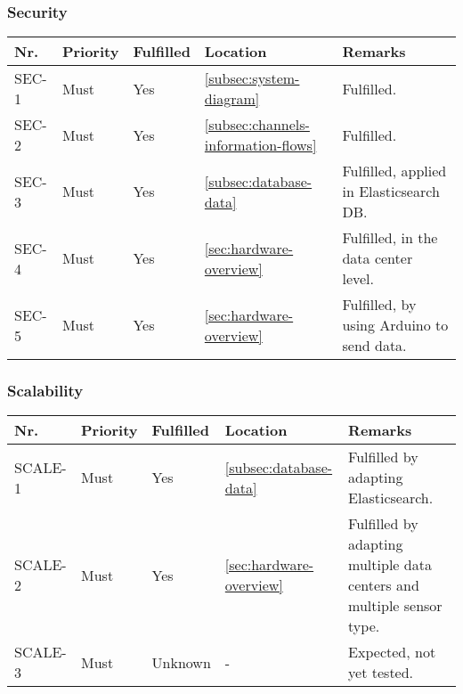 \subsubsection{Security}
\begin{table}[H]
	\begin{tabular}{lllll}
						    
		Nr.   & Priority & Fulfilled & Location & Remarks \\ \hline
		SEC-1 & Must     & Yes      & \ref{subsec:system-diagram} & Fulfilled. \\ 
		SEC-2 & Must     & Yes      & \ref{subsec:channels-information-flows} & Fulfilled. \\ 
		SEC-3 & Must     & Yes      & \ref{subsec:database-data} & Fulfilled, applied in Elasticsearch DB. \\ 
		SEC-4 & Must     & Yes      & \ref{sec:hardware-overview} & Fulfilled, in the data center level. \\ 
		SEC-5 & Must     & Yes      & \ref{sec:hardware-overview} & Fulfilled, by using Arduino to send data.\\
						
	\end{tabular}
\end{table}

\subsubsection{Scalability}
\begin{table}[H]
	\begin{tabular}{lllll}
						    
		Nr.     & Priority & Fulfilled & Location & Remarks \\ \hline
		SCALE-1 & Must     & Yes      & \ref{subsec:database-data} & Fulfilled by adapting Elasticsearch. \\ 
		SCALE-2 & Must     & Yes      & \ref{sec:hardware-overview} & Fulfilled by adapting multiple data centers and multiple sensor type. \\ 
		SCALE-3 & Must     & Unknown  & -         & Expected, not yet tested. \\
						
	\end{tabular}
\end{table}

\clearpage


